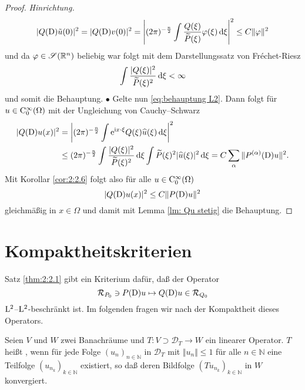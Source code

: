 \begin{proof}{\it Hinrichtung.}
\begin{equation}
|Q(\mathrm D)\tilde{u}(0)|^2 = |Q(\mathrm D)v(0)|^2 = \left|(2 \pi)^{-\frac{n}{2}} \int \frac{Q(\xi)}{\widetilde{P}(\xi)} \varphi(\xi) \,\mathrm d \xi \right|^2 \leq {C} \Vert \varphi \Vert^2
\end{equation}
und da $\varphi\in\mathscr S(\mathbb R^n)$ beliebig war folgt mit dem Darstellungssatz von Fréchet-Riesz
\begin{equation}\label{eq:behauptung L2}
\int \frac{|Q(\xi)|^2}{\widetilde{P}(\xi)^2} \,\mathrm d \xi < \infty
\end{equation}
und somit die Behauptung. $\bullet$
Gelte nun \eqref{eq:behauptung L2}. Dann folgt für $u \in \mathrm C_0^{\infty}(\Omega)$ mit der Ungleichung von Cauchy--Schwarz
\begin{align}
|Q(\mathrm D)u(x)|^2 &=  \left|(2 \pi)^{-\frac{n}{2}} \int \mathrm e^{\mathrm i x \cdot \xi} Q(\xi) \widehat{u}(\xi)  \,\mathrm d \xi \right|^2 \notag
\\ & \leq (2 \pi)^{-\frac{n}{2}} \int \frac{|Q(\xi)|^2}{\widetilde{P}(\xi)^2} \,\mathrm d \xi \int \widetilde{P}(\xi)^2 | \widehat{u}(\xi)|^2 \,\mathrm d \xi = C \sum_{\alpha} \Vert P^{(\alpha)}(\mathrm D)u\Vert^2.
\end{align}
Mit Korollar \ref{cor:2:2.6} folgt also für alle $u \in \mathrm C_0^{\infty}(\Omega)$
\begin{equation}
|Q(\mathrm D)u(x)|^2 \leq C \Vert P(\mathrm D)u\Vert^2
\end{equation}
gleichmäßig in $x\in\Omega$ und damit mit Lemma \ref{lm: Qu stetig} die Behauptung.
\end{proof}

\section{Kompaktheitskriterien}
Satz \ref{thm:2:2.1} gibt ein Kriterium dafür, daß der Operator
\begin{equation}\label{eq:2:map}
\mathcal R_{P_0}\ni P(\mathrm D)u\mapsto Q(\mathrm D)u\in  \mathcal R_{Q_0}
\end{equation}
$\mathrm L^2$--$\mathrm L^2$-beschränkt ist. Im folgenden fragen wir nach der Kompaktheit dieses Operators. 

\begin{df}
Seien $V$ und $W$ zwei Banachräume und $T: V \supset \mathcal{D}_T \rightarrow W$ ein linearer Operator. $T$ heißt , wenn für jede Folge $(u_n)_{n \in \mathbb{N}}$ in $\mathcal{D}_T$ mit $\Vert u_n \Vert \leq 1$ für alle $n \in \mathbb{N}$ eine Teilfolge $(u_{n_k})_{k \in \mathbb{N}}$ existiert, so daß deren Bildfolge $(Tu_{n_k})_{k\in \mathbb{N}}$ in $W$ konvergiert.
\end{df}


